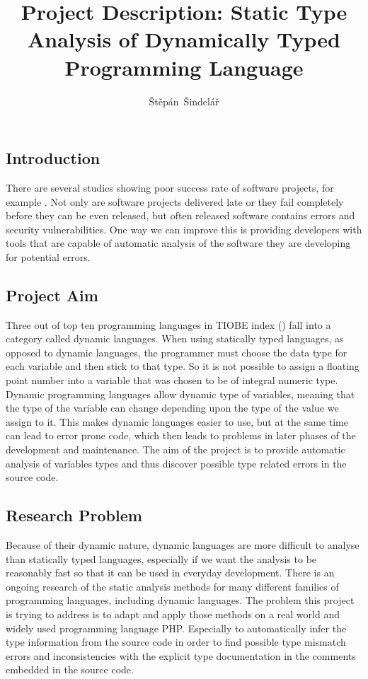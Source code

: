 \documentclass[a4paper,twoside]{article}
\author{Štěpán~Šindelář}
\title{Project Description: Static Type Analysis of Dynamically Typed Programming Language}
\begin{document}
  \maketitle

  \subsection*{Introduction}  
  There are several studies showing poor success rate of software projects, for example \cite{ellis2008impact}. 
  Not only are software projects delivered late or they fail completely before 
  they can be even released, but often released software contains errors and 
  security vulnerabilities. One way we can improve this is providing developers 
  with tools that are capable of automatic analysis of the software they 
  are developing for potential errors.
  
  \subsection*{Project Aim}  
  Three out of top ten programming languages in TIOBE index (\cite{tiobe}) fall into 
  a category called dynamic languages. 
  When using statically typed languages, as opposed to dynamic languages, 
  the programmer must choose the data type for each variable and then stick to that type. 
  So it is not possible to assign a floating point number into a variable that was chosen to be of integral numeric type.
  Dynamic programming languages allow dynamic type of variables, meaning that the type of the variable 
  can change depending upon the type of the value we assign to it. 
  This makes dynamic languages easier to use, 
  but at the same time can lead to error prone code, which then leads to 
  problems in later phases of the development and maintenance. 
  The aim of the project is to provide automatic analysis of variables types and 
  thus discover possible type related errors in the source code.
  
  \subsection*{Research Problem}
  Because of their dynamic nature, dynamic languages are more difficult to analyse 
  than statically typed languages, especially if we want the analysis to be 
  reasonably fast so that it can be used in everyday development.   
  There is an ongoing research of the static analysis methods for many different 
  families of programming languages, including dynamic languages. The problem 
  this project is trying to address is to adapt and apply those methods on 
  a real world and widely used programming language PHP. Especially to automatically 
  infer the type information from the source code in order to find possible 
  type mismatch errors and inconsistencies with the explicit type 
  documentation in the comments embedded in the source code.
  
\end{document}
